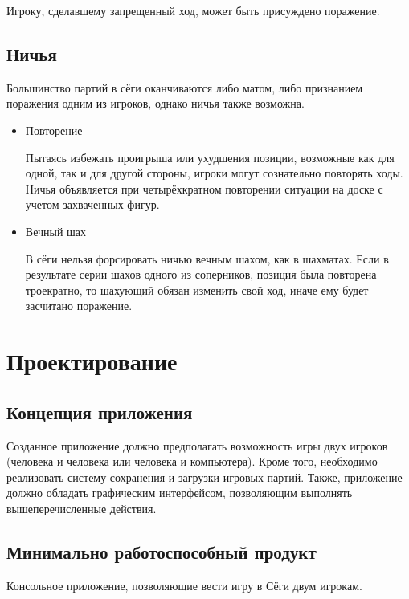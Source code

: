 Игроку, сделавшему запрещенный ход, может быть присуждено поражение.

\subsection{Ничья}

Большинство партий в сёги оканчиваются либо матом, либо признанием поражения одним из игроков, однако ничья также возможна.

\begin{itemize}


	\item Повторение
	
	Пытаясь избежать проигрыша или ухудшения позиции, возможные как для одной, так и для 		другой стороны, игроки могут сознательно повторять ходы. Ничья объявляется при 				четырёхкратном повторении ситуации на доске с учетом захваченных фигур.


	\item Вечный шах

	В сёги нельзя форсировать ничью вечным шахом, как в шахматах. Если в результате серии 		шахов одного из соперников, позиция была повторена троекратно, то шахующий обязан 			изменить свой ход, иначе ему будет засчитано поражение.
   
\end{itemize}


\section{Проектирование}

\subsection{Концепция приложения} 

Созданное приложение должно предполагать возможность игры двух игроков (человека и человека или человека и компьютера). Кроме того, необходимо реализовать систему сохранения и загрузки игровых партий. Также, приложение должно обладать графическим интерфейсом, позволяющим выполнять вышеперечисленные действия.

\subsection{Минимально работоспособный продукт}

Консольное приложение, позволяющие вести игру в Сёги двум игрокам.

